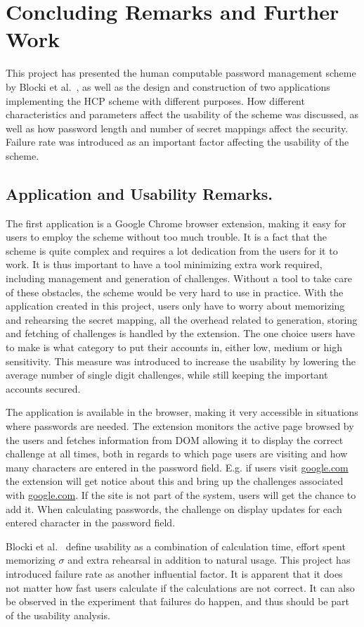 \chapter{Concluding Remarks and Further Work}
This project has presented the human computable password management scheme by Blocki et al.~\cite{hcp-blocki}, as well as the design and construction of two applications implementing the HCP scheme with different purposes. How different characteristics and parameters affect the usability of the scheme was discussed, as well as how password length and number of secret mappings affect the security. Failure rate was introduced as an important factor affecting the usability of the scheme. 

\section{Application and Usability Remarks.}
\par The first application is a Google Chrome browser extension, making it easy for users to employ the scheme without too much trouble. It is a fact that the scheme is quite complex and requires a lot dedication from the users for it to work. It is thus important to have a tool minimizing extra work required, including management and generation of challenges. Without a tool to take care of these obstacles, the scheme would be very hard to use in practice. With the application created in this project, users only have to worry about memorizing and rehearsing the secret mapping, all the overhead related to generation, storing and fetching of challenges is handled by the extension. The one choice users have to make is what category to put their accounts in, either low, medium or high sensitivity. This measure was introduced to increase the usability by lowering the average number of single digit challenges, while still keeping the important accounts secured.
\par The application is available in the browser, making it very accessible in situations where passwords are needed. The extension monitors the active page browsed by the users and fetches information from DOM allowing it to display the correct challenge at all times, both in regards to which page users are visiting and how many characters are entered in the password field. E.g. if users visit \url{google.com} the extension will get notice about this and bring up the challenges associated with \url{google.com}. If the site is not part of the system, users will get the chance to add it. When calculating passwords, the challenge on display updates for each entered character in the password field.
\par Blocki et al.~\cite{hcp-blocki} define usability as a combination of calculation time, effort spent memorizing $\sigma$ and extra rehearsal in addition to natural usage. This project has introduced failure rate as another influential factor. It is apparent that it does not matter how fast users calculate if the calculations are not correct. It can also be observed in the experiment that failures do happen, and thus should be part of the usability analysis.

